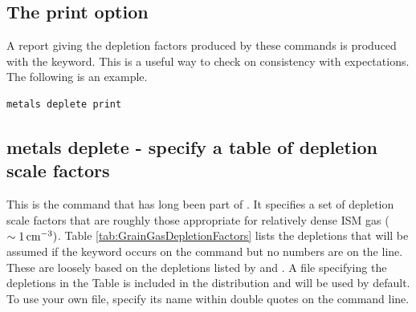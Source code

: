 \subsection{The print option}
A report giving the depletion factors produced by these commands is produced with
the  keyword.
This is a useful way to check on consistency with expectations.  
The following is an example.
\begin{verbatim}
metals deplete print
\end{verbatim}

\subsection{metals deplete - specify a table of depletion scale factors}

This is the  command that has long been part of \Cloudy.
It specifies a set of depletion scale factors that are roughly those appropriate for
relatively dense ISM gas ($\sim 1 {\rm\thinspace cm^{-3}})$.
Table \ref{tab:GrainGasDepletionFactors} lists
the depletions that will be assumed if the keyword
 occurs on the
 command but no numbers are on the line.
These are loosely based
on the depletions listed by \citet{Jenkins1987} and \citet{Cowie1986}.
A file specifying the depletions in the Table is included in the distribution
and will be used by default.  To use your own file,
specify its name within double quotes on the command line.

